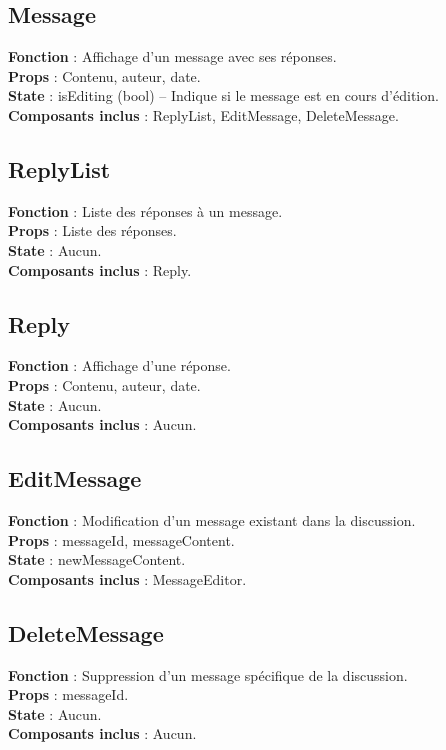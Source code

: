 \documentclass{article}
\begin{document}
\subsection*{Message}
\textbf{Fonction} : Affichage d'un message avec ses réponses.\\
\textbf{Props} : Contenu, auteur, date.\\
\textbf{State} : isEditing (bool) – Indique si le message est en cours d'édition.\\
\textbf{Composants inclus} : ReplyList, EditMessage, DeleteMessage.

\subsection*{ReplyList}
\textbf{Fonction} : Liste des réponses à un message.\\
\textbf{Props} : Liste des réponses.\\
\textbf{State} : Aucun.\\
\textbf{Composants inclus} : Reply.

\subsection*{Reply}
\textbf{Fonction} : Affichage d'une réponse.\\
\textbf{Props} : Contenu, auteur, date.\\
\textbf{State} : Aucun.\\
\textbf{Composants inclus} : Aucun.

\subsection*{EditMessage}
\textbf{Fonction} : Modification d'un message existant dans la discussion.\\
\textbf{Props} : messageId, messageContent.\\
\textbf{State} : newMessageContent.\\
\textbf{Composants inclus} : MessageEditor.

\subsection*{DeleteMessage}
\textbf{Fonction} : Suppression d'un message spécifique de la discussion.\\
\textbf{Props} : messageId.\\
\textbf{State} : Aucun.\\
\textbf{Composants inclus} : Aucun.
\end{document}
